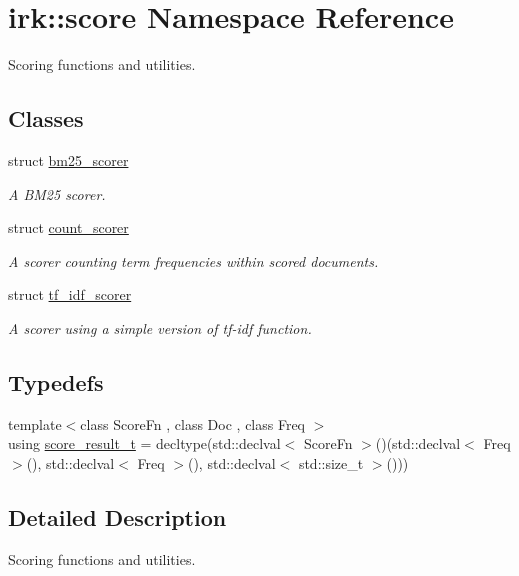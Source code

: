 \hypertarget{namespaceirk_1_1score}{}\section{irk\+:\+:score Namespace Reference}
\label{namespaceirk_1_1score}


Scoring functions and utilities.  


\subsection*{Classes}
\begin{DoxyCompactItemize}
\item 
struct \mbox{\hyperlink{structirk_1_1score_1_1bm25__scorer}{bm25\+\_\+scorer}}
\begin{DoxyCompactList}\small\item\em A B\+M25 scorer. \end{DoxyCompactList}\item 
struct \mbox{\hyperlink{structirk_1_1score_1_1count__scorer}{count\+\_\+scorer}}
\begin{DoxyCompactList}\small\item\em A scorer counting term frequencies within scored documents. \end{DoxyCompactList}\item 
struct \mbox{\hyperlink{structirk_1_1score_1_1tf__idf__scorer}{tf\+\_\+idf\+\_\+scorer}}
\begin{DoxyCompactList}\small\item\em A scorer using a simple version of tf-\/idf function. \end{DoxyCompactList}\end{DoxyCompactItemize}
\subsection*{Typedefs}
\begin{DoxyCompactItemize}
\item 
{\footnotesize template$<$class Score\+Fn , class Doc , class Freq $>$ }\\using \mbox{\hyperlink{namespaceirk_1_1score_af4a2c84b3548a4ac12aac3862bc94875}{score\+\_\+result\+\_\+t}} = decltype(std\+::declval$<$ Score\+Fn $>$()(std\+::declval$<$ Freq $>$(), std\+::declval$<$ Freq $>$(), std\+::declval$<$ std\+::size\+\_\+t $>$()))
\end{DoxyCompactItemize}


\subsection{Detailed Description}
Scoring functions and utilities. 


